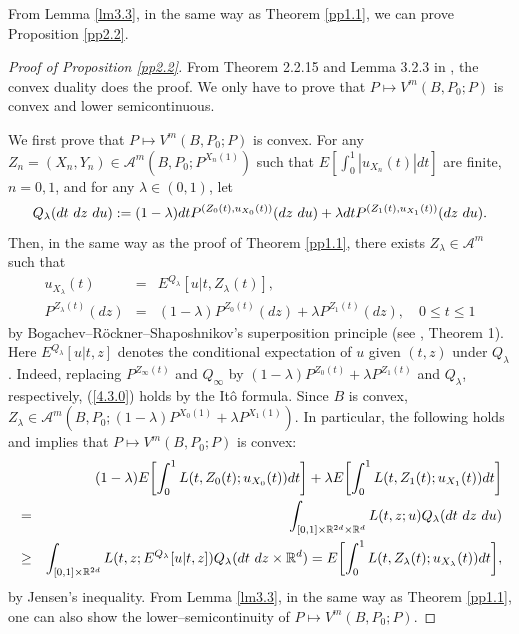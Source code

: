 \documentclass[12pt]{article}
\begin{document}
From Lemma \ref{lm3.3}, in the same way as Theorem \ref{pp1.1},
we can prove Proposition \ref{pp2.2}.

\begin{proof}[Proof of Proposition \ref{pp2.2}]
From Theorem 2.2.15 and Lemma 3.2.3 in \cite{DS}, the convex duality does the proof.
We only have to prove that $P\mapsto V^m(B,P_0;P)$ is convex and lower semicontinuous.

We first prove that $P\mapsto V^m(B,P_0;P)$ is convex.
For any  $Z_n=(X_n, Y_n)\in \mathcal{A}^m(B, P_0;P^{X_n(1)})$ such that $E[\int_0^1 |u_{X_n} (t)|dt]$ are finite, $n=0,1$,  and  for any $\lambda\in (0,1)$, let 
$$Q_\lambda(dt\hbox{ }dz\hbox{ }du):=(1-\lambda) dt P^{(Z_0(t),u_{X_0} (t))}(dz\hbox{ }du)
 +\lambda dt P^{(Z_1(t),u_{X_1} (t))}(dz\hbox{ }du).
$$
Then, in the same way as the proof of Theorem \ref{pp1.1},
 there exists $Z_\lambda \in \mathcal{A}^m$ such that 
\begin{eqnarray}
u_{X_\lambda} (t)&=&
E^{Q_\lambda}[u|t,Z_\lambda(t)],\\
P^{Z_\lambda(t)}(dz)&=&(1-\lambda) P^{Z_0(t)}(dz)+\lambda P^{Z_1(t)}(dz),
\quad 0\le t\le 1
\end{eqnarray}
by Bogachev--R\"ockner--Shaposhnikov's superposition principle (see \cite{Bog21}, Theorem 1).
Here
$E^{Q_\lambda}[u|t,z]$ denotes the conditional expectation of $u$ given $(t,z)$ under $Q_\lambda$.
Indeed, replacing $P^{Z_\infty (t)}$ and $Q_\infty$ by $(1-\lambda) P^{Z_0(t)}+\lambda P^{Z_1(t)}$
and $Q_\lambda$, respectively, (\ref{4.3.0}) holds by the It\^o formula.
Since $B$ is convex, $Z_\lambda\in \mathcal{A}^m(B, P_0;(1-\lambda) P^{X_0(1)}
+\lambda  P^{X_1(1)})$.
In particular, the following holds and implies that $P\mapsto V^m(B,P_0;P)$ is convex:
\begin{eqnarray}
&&(1-\lambda) E\biggl[\int_0^1 L(t,Z_0(t);u_{X_0} (t))dt \biggr]
+\lambda E\biggl[\int_0^1 L(t,Z_1(t);u_{X_1} (t))dt \biggr]\\
&=&\int_{[0,1]\times \mathbb{R}^{2d}\times \mathbb{R}^{d} }
L(t,z;u)Q_\lambda(dt\hbox{ }dz\hbox{ }du)\nonumber\\
&\ge& \int_{[0,1]\times \mathbb{R}^{2d}}
L(t,z;E^{Q_\lambda}[u|t,z])Q_\lambda(dt\hbox{ }dz\times \mathbb{R}^{d} )
=E\biggl[\int_0^1 L(t,Z_\lambda(t);u_{X_\lambda} (t))dt \biggr],\nonumber
\end{eqnarray}
by Jensen's inequality.
From Lemma \ref{lm3.3}, in the same way as Theorem \ref{pp1.1},
one can also show the lower--semicontinuity of $P\mapsto V^m(B,P_0;P)$.
\end{proof}
\end{document}
